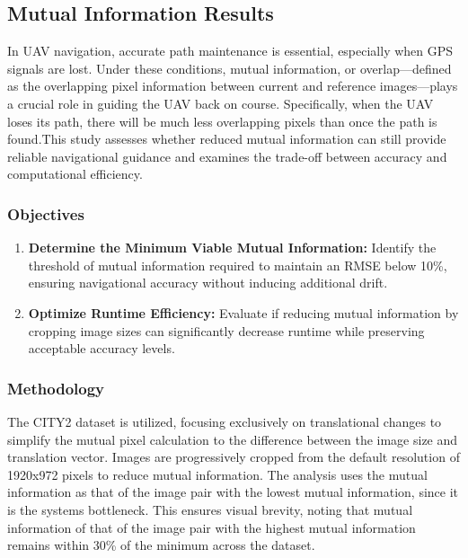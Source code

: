 \subsection{Mutual Information Results}

In UAV navigation, accurate path maintenance is essential, especially when GPS signals are lost. Under these conditions, mutual information, or overlap—defined as the overlapping pixel information between current and reference images—plays a crucial role in guiding the UAV back on course. Specifically, when the UAV loses its path, there will be much less overlapping pixels than once the path is found.This study assesses whether reduced mutual information can still provide reliable navigational guidance and examines the trade-off between accuracy and computational efficiency.

\subsubsection{Objectives}

\begin{enumerate}
    \item \textbf{Determine the Minimum Viable Mutual Information:} Identify the threshold of mutual information required to maintain an RMSE below 10\%, ensuring navigational accuracy without inducing additional drift.
    \item \textbf{Optimize Runtime Efficiency:} Evaluate if reducing mutual information by cropping image sizes can significantly decrease runtime while preserving acceptable accuracy levels.
\end{enumerate}

\subsubsection{Methodology}

The CITY2 dataset is utilized, focusing exclusively on translational changes to simplify the mutual pixel calculation to the difference between the image size and translation vector. Images are progressively cropped from the default resolution of 1920x972 pixels to reduce mutual information. The analysis uses the mutual information as that of the image pair with the lowest mutual information, since it is the systems bottleneck. This ensures visual brevity, noting that mutual information of that of the image pair with the highest mutual information remains within 30\% of the minimum across the dataset.

